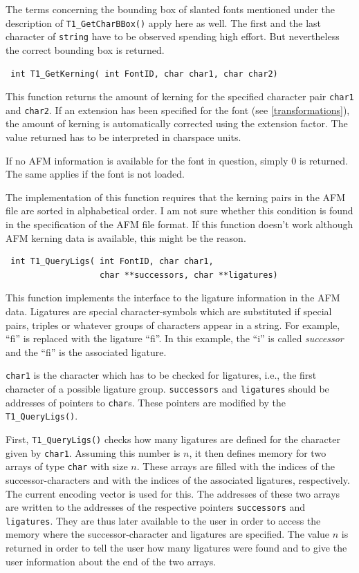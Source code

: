 The terms concerning the bounding box of slanted fonts mentioned under the
description of \verb+T1_GetCharBBox()+ apply here as well. The first and the
last character of \verb+string+ have to be observed spending high effort.
But nevertheless the correct bounding box is returned.

\precorr
\begin{verbatim}
 int T1_GetKerning( int FontID, char char1, char char2)
\end{verbatim}\postcorr
This function returns the amount of kerning for the specified character
pair \verb+char1+ and \verb+char2+. If an extension has been specified
for the font (see \ref{transformations}), the amount of
kerning is automatically corrected using the extension factor. The
value returned has to be interpreted in charspace units.

If no AFM information is available for the font in question, simply 0
is returned. The same applies if the font is not loaded.

The implementation of this function requires that the kerning pairs in
the AFM file are sorted in alphabetical order. I am not sure
whether this condition is found in the specification of the AFM file
format. If this function doesn't work although AFM kerning data is
available, this might be the reason.

\precorr
\begin{verbatim}
 int T1_QueryLigs( int FontID, char char1,
                   char **successors, char **ligatures)
\end{verbatim}\postcorr
This function implements the interface to the ligature information in
the AFM data. Ligatures are special character-symbols which are
substituted if special pairs, 
triples or whatever groups of characters appear in a string. For example,
``f{}i'' is replaced with the ligature ``fi''. In this example, the ``i'' is
called {\em successor} and the ``fi'' is the associated ligature.

\verb+char1+ is the character
which has to be checked for ligatures, i.e., the first character of a possible
ligature group. \verb+successors+ and \verb+ligatures+ should be addresses of
pointers to \verb+char+s. These pointers are modified by the
\verb+T1_QueryLigs()+. 

First, \verb+T1_QueryLigs()+ checks how many ligatures are defined for the
character given by \verb+char1+. Assuming this number is $n$, it then
defines memory for two arrays of type \verb+char+ with size
$n$. These arrays are filled with the indices of the
successor-characters and with 
the indices of the associated ligatures, respectively. The current 
encoding vector is used for this. The addresses of these two arrays
are written to the
addresses of the respective  pointers \verb+successors+ and \verb+ligatures+.
They are thus later available to the user in order to access the memory where
the successor-character and ligatures are specified. The value $n$ is returned
in order to tell the user how many ligatures were found and to give
the user information about the end of the two arrays. 

